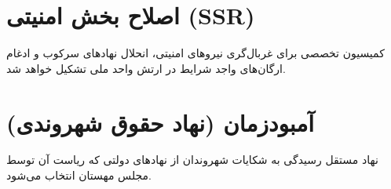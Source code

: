 \section{اصلاح بخش امنیتی (SSR)}
کمیسیون تخصصی برای غربال‌گری نیروهای امنیتی، انحلال نهادهای سرکوب و ادغام ارگان‌های واجد شرایط در ارتش واحد ملی تشکیل خواهد شد.

\section{آمبودزمان (نهاد حقوق شهروندی)}
نهاد مستقل رسیدگی به شکایات شهروندان از نهادهای دولتی که ریاست آن توسط مجلس مهستان انتخاب می‌شود.
